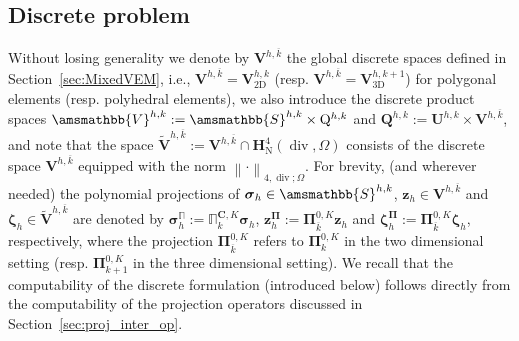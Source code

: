 \documentclass[fleqn,a4paper]{cas-sc}
\newcommand{\norm}[1]{\left\|#1\right\|}
\newcommand\vdiv{\mathop{\mathrm{div}}\nolimits}
\newcommand{\bC}{\mathbf{C}}
\newcommand{\bbS}{\amsmathbb{S}}
\newcommand{\bz}{\boldsymbol{z}}
\newcommand{\bzeta}{\boldsymbol{\zeta}}
\newcommand{\bPi}{\boldsymbol{\Pi}}
\newcommand{\0}{\boldsymbol{0}}
\newcommand\bU{\mathbf{U}}
\newcommand\bQ{\mathbf{Q}}
\newcommand\bV{\mathbf{V}}
\newcommand\rQ{\mathrm{Q}}
\newcommand\bbV{\amsmathbb{V}}
\newcommand\bH{\mathbf{H}}
\newcommand\bbPi{\mathbb{\Pi}}
\newcommand\bsigma{\boldsymbol{\sigma}}
\numberwithin{equation}{section}
\numberwithin{figure}{section}
\begin{document}
\subsection{Discrete problem} \label{sec:discrete-problem} 
Without losing generality we denote by $\bV^{h,\overline{k}}$ the global discrete spaces defined in Section~\ref{sec:MixedVEM}, i.e., $\bV^{h,\overline{k}}=\bV^{h,k}_{\text{2D}}$ (resp. $\bV^{h,\overline{k}}=\bV^{h,k+1}_{\text{3D}}$) for polygonal elements (resp. polyhedral elements), we also introduce the discrete product spaces $\bbV^{h,k}:= \bbS^{h,k}\times \rQ^{h,k}$ and $\bQ^{h,k}:=\bU^{h,k}\times \bV^{h,\overline{k}}$, 
and note that the space $\widetilde{\bV}^{h,\overline{k}}:=\bV^{h,\overline{k}}\cap\bH_{\mathrm{N}}^4(\vdiv,\Omega)$ consists of the discrete space $\bV^{h,\overline{k}}$ equipped with  the norm  $\norm{\cdot}_{4,\vdiv;\Omega}$. For brevity, (and wherever needed) the polynomial projections of $\bsigma_h\in \bbS^{h,k}$, $\bz_h\in \bV^{h,\overline{k}}$ and $\bzeta_h \in \widetilde{\bV}^{h,\overline{k}}$ are denoted by  $\bsigma_h^{\bbPi}:=\bbPi_{k}^{\bC,K}\bsigma_h$, $\bz_h^{\bPi}:=\bPi_{\overline{k}}^{0,K}\bz_h$ and $\bzeta_h^{\bPi}:=\bPi_{\overline{k}}^{0,K}\bzeta_h$, respectively, where the projection $\bPi_{\overline{k}}^{0,K}$ refers to $\bPi_{k}^{0,K}$ in the two dimensional setting (resp. $\bPi_{k+1}^{0,K}$ in the three dimensional setting). We recall that the computability of the discrete formulation (introduced below) follows directly from the computability of the projection operators discussed in Section~\ref{sec:proj_inter_op}.
\end{document}
